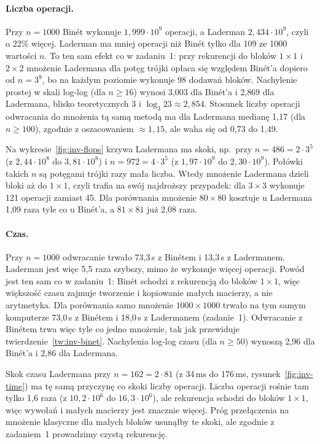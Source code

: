 \paragraph{Liczba operacji.} Przy $n=1000$ Binét wykonuje $1{,}999\cdot10^9$ operacji, a Laderman
$2{,}434\cdot10^9$, czyli o 22\% więcej. Laderman ma mniej operacji niż Binét tylko dla 109 ze 1000 wartości $n$.
To ten sam efekt co w zadaniu~1: przy rekurencji do bloków $1\times1$ i $2\times2$ mnożenie Ladermana dla potęg
trójki opłaca się względem Binét'a dopiero od $n=3^9$, bo na każdym poziomie wykonuje 98 dodawań bloków. Nachylenie prostej w skali log-log
(dla $n\ge16$) wynosi 3{,}003 dla Binét'a i 2{,}869 dla Ladermana, blisko teoretycznych $3$ i
$\log_3 23\approx2{,}854$. Stosunek liczby operacji odwracania do mnożenia tą samą metodą ma dla Ladermana
medianę 1{,}17 (dla $n\ge100$), zgodnie z oszacowaniem $\approx1{,}15$, ale waha się od 0{,}73 do 1{,}49.

Na wykresie~\ref{fig:inv-flops} krzywa Ladermana ma skoki, np.\ przy $n=486=2\cdot3^5$ (z $2{,}44\cdot10^8$ do
$3{,}81\cdot10^8$) i $n=972=4\cdot3^5$ (z $1{,}97\cdot10^9$ do $2{,}30\cdot10^9$). Połówki takich $n$ są potęgami
trójki razy mała liczba. Wtedy mnożenie Ladermana dzieli bloki aż do $1\times1$, czyli trafia na swój najdroższy
przypadek: dla $3\times3$ wykonuje 121 operacji zamiast 45. Dla porównania mnożenie $80\times80$ kosztuje u Ladermana
1{,}09 raza tyle co u Binét'a, a $81\times81$ już 2{,}08 raza.

\paragraph{Czas.} Przy $n=1000$ odwracanie trwało 73{,}3\,s z Binétem i 13{,}3\,s z Ladermanem. Laderman jest więc
5{,}5 raza szybszy, mimo że wykonuje więcej operacji. Powód jest ten sam co w zadaniu~1: Binét schodzi z rekurencją
do bloków $1\times1$, więc większość czasu zajmuje tworzenie i kopiowanie małych macierzy, a nie arytmetyka.
Dla porównania samo mnożenie $1000\times1000$ trwało na tym samym komputerze 73{,}0\,s z Binétem i 18{,}0\,s
z Ladermanem (zadanie~1). Odwracanie z Binétem trwa więc tyle co jedno mnożenie, tak jak przewiduje
twierdzenie~\ref{tw:inv-binet}. Nachylenia log-log czasu (dla $n\ge50$) wynoszą 2{,}96 dla Binét'a i 2{,}86 dla
Ladermana.

Skok czasu Ladermana przy $n=162=2\cdot81$ (z 34\,ms do 176\,ms, rysunek~\ref{fig:inv-time}) ma tę samą przyczynę co
skoki liczby operacji. Liczba operacji rośnie tam tylko 1{,}6 raza (z $10{,}2\cdot10^6$ do $16{,}3\cdot10^6$), ale
rekurencja schodzi do bloków $1\times1$, więc wywołań i małych macierzy jest znacznie więcej. Próg przełączenia na
mnożenie klasyczne dla małych bloków usunąłby te skoki, ale zgodnie z zadaniem~1 prowadzimy czystą rekurencję.

